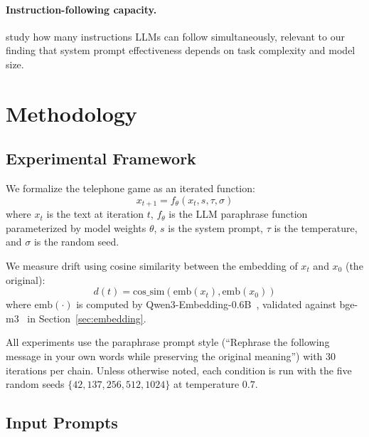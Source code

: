 \documentclass[11pt]{article}
\begin{document}
\paragraph{Instruction-following capacity.}
\citet{jaroslawicz2025ifscale} study how many instructions LLMs can follow
simultaneously, relevant to our finding that system prompt effectiveness depends
on task complexity and model size.

\section{Methodology}
\label{sec:method}

\subsection{Experimental Framework}
\label{sec:framework}

We formalize the telephone game as an iterated function:
\begin{equation}
  x_{t+1} = f_\theta(x_t, s, \tau, \sigma)
\end{equation}
where $x_t$ is the text at iteration $t$, $f_\theta$ is the LLM paraphrase
function parameterized by model weights $\theta$, $s$ is the system prompt,
$\tau$ is the temperature, and $\sigma$ is the random seed.

We measure drift using cosine similarity between the embedding of $x_t$ and
$x_0$ (the original):
\begin{equation}
  d(t) = \text{cos\_sim}(\text{emb}(x_t), \text{emb}(x_0))
\end{equation}
where $\text{emb}(\cdot)$ is computed by
Qwen3-Embedding-0.6B~\citep{zhang2025qwen3embedding}, validated against
bge-m3~\citep{chen2024bgem3} in Section~\ref{sec:embedding}.

All experiments use the paraphrase prompt style (``Rephrase the following message
in your own words while preserving the original meaning'') with 30 iterations per
chain. Unless otherwise noted, each condition is run with the five random seeds
$\{42, 137, 256, 512, 1024\}$ at temperature $0.7$.

\subsection{Input Prompts}
\label{sec:prompts}
\end{document}
